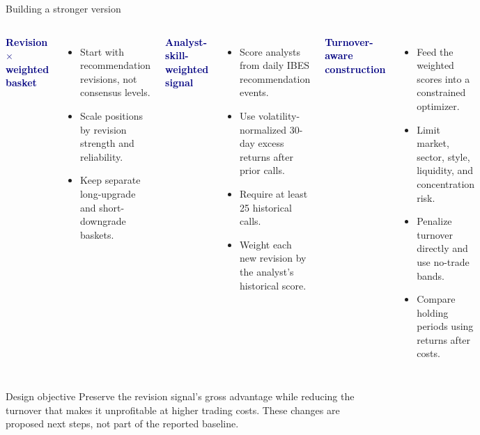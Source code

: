 \documentclass[aspectratio=169,10pt]{beamer}
\newcommand{\smallhead}[1]{\textcolor{navy}{\textbf{#1}}}
\begin{document}
\begin{frame}[shrink=3]{Building a stronger version}
\begin{columns}[T,onlytextwidth]
\smallhead{Revision $\times$ weighted basket}
\begin{itemize}\setlength\itemsep{0.38em}
  \item Start with recommendation revisions, not consensus levels.
  \item Scale positions by revision strength and reliability.
  \item Keep separate long-upgrade and short-downgrade baskets.
\end{itemize}
\smallhead{Analyst-skill-weighted signal}
\begin{itemize}\setlength\itemsep{0.38em}
  \item Score analysts from daily IBES recommendation events.
  \item Use volatility-normalized 30-day excess returns after prior calls.
  \item Require at least 25 historical calls.
  \item Weight each new revision by the analyst's historical score.
\end{itemize}
\smallhead{Turnover-aware construction}
\begin{itemize}\setlength\itemsep{0.38em}
  \item Feed the weighted scores into a constrained optimizer.
  \item Limit market, sector, style, liquidity, and concentration risk.
  \item Penalize turnover directly and use no-trade bands.
  \item Compare holding periods using returns after costs.
\end{itemize}
\end{columns}
\vspace{0.55cm}
\begin{block}{Design objective}
Preserve the revision signal's gross advantage while reducing the turnover that makes it unprofitable at higher trading costs. These changes are proposed next steps, not part of the reported baseline.
\end{block}
\end{frame}
\end{document}
